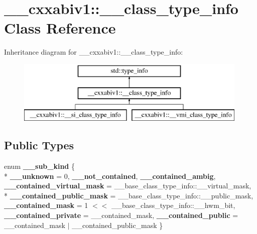 \hypertarget{class____cxxabiv1_1_1____class__type__info}{\section{\+\_\+\+\_\+cxxabiv1\+:\+:\+\_\+\+\_\+class\+\_\+type\+\_\+info Class Reference}
\label{class____cxxabiv1_1_1____class__type__info}
}
Inheritance diagram for \+\_\+\+\_\+cxxabiv1\+:\+:\+\_\+\+\_\+class\+\_\+type\+\_\+info\+:\begin{figure}[H]
\begin{center}
\leavevmode
\includegraphics[height=3.000000cm]{class____cxxabiv1_1_1____class__type__info}
\end{center}
\end{figure}
\subsection*{Public Types}
\begin{DoxyCompactItemize}
\item 
\hypertarget{class____cxxabiv1_1_1____class__type__info_ad06737ba82482be11ada302793caec9e}{enum {\bfseries \+\_\+\+\_\+sub\+\_\+kind} \{ \\*
{\bfseries \+\_\+\+\_\+unknown} = 0, 
{\bfseries \+\_\+\+\_\+not\+\_\+contained}, 
{\bfseries \+\_\+\+\_\+contained\+\_\+ambig}, 
{\bfseries \+\_\+\+\_\+contained\+\_\+virtual\+\_\+mask} = \+\_\+\+\_\+base\+\_\+class\+\_\+type\+\_\+info\+:\+:\+\_\+\+\_\+virtual\+\_\+mask, 
\\*
{\bfseries \+\_\+\+\_\+contained\+\_\+public\+\_\+mask} = \+\_\+\+\_\+base\+\_\+class\+\_\+type\+\_\+info\+:\+:\+\_\+\+\_\+public\+\_\+mask, 
{\bfseries \+\_\+\+\_\+contained\+\_\+mask} = 1 $<$$<$ \+\_\+\+\_\+base\+\_\+class\+\_\+type\+\_\+info\+:\+:\+\_\+\+\_\+hwm\+\_\+bit, 
{\bfseries \+\_\+\+\_\+contained\+\_\+private} = \+\_\+\+\_\+contained\+\_\+mask, 
{\bfseries \+\_\+\+\_\+contained\+\_\+public} = \+\_\+\+\_\+contained\+\_\+mask $\vert$ \+\_\+\+\_\+contained\+\_\+public\+\_\+mask
 \}}\label{class____cxxabiv1_1_1____class__type__info_ad06737ba82482be11ada302793caec9e}

\end{DoxyCompactItemize}
